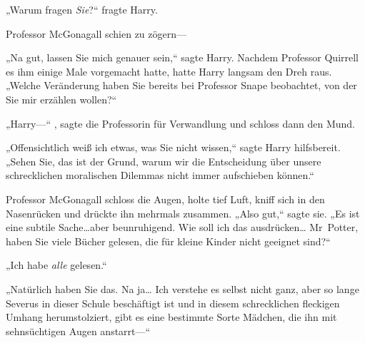 „Warum fragen \emph{Sie}?“ fragte Harry.

Professor McGonagall schien zu zögern—

„Na gut, lassen Sie mich genauer sein,“ sagte Harry. Nachdem Professor Quirrell es ihm einige Male vorgemacht hatte, hatte Harry langsam den Dreh raus.
„Welche Veränderung haben Sie bereits bei Professor Snape beobachtet, von der Sie mir erzählen wollen?“

„Harry—“ , sagte die Professorin für Verwandlung und schloss dann den Mund.

„Offensichtlich weiß ich etwas, was Sie nicht wissen,“ sagte Harry hilfsbereit. „Sehen Sie, das ist der Grund, warum wir die Entscheidung über unsere schrecklichen moralischen Dilemmas nicht immer aufschieben können.“

Professor McGonagall schloss die Augen, holte tief Luft, kniff sich in den Nasenrücken und drückte ihn mehrmals zusammen.
„Also gut,“ sagte sie. „Es ist eine subtile Sache…aber beunruhigend. Wie soll ich das ausdrücken… Mr~Potter, haben Sie viele Bücher gelesen, die für kleine Kinder nicht geeignet sind?“

„Ich habe \emph{alle} gelesen.“

„Natürlich haben Sie das. Na ja… Ich verstehe es selbst nicht ganz, aber so lange Severus in dieser Schule beschäftigt ist und in diesem schrecklichen fleckigen Umhang herumstolziert, gibt es eine bestimmte Sorte Mädchen, die ihn mit sehnsüchtigen Augen anstarrt—“

